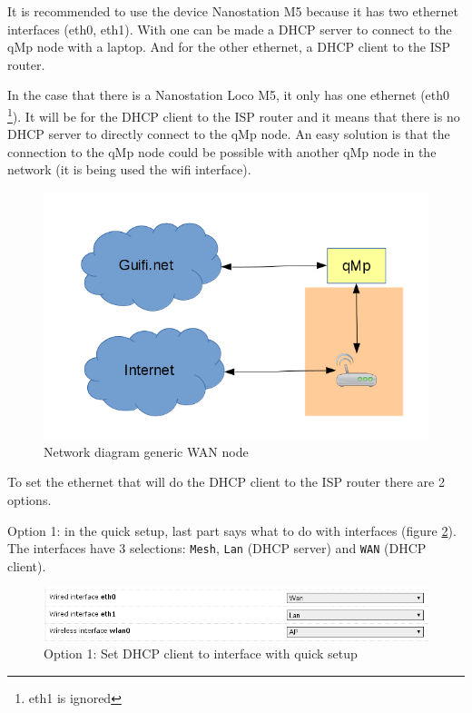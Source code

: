 \documentclass[11pt]{article}
\begin{document}
It is recommended to use the device Nanostation M5 because it has two
ethernet interfaces (eth0, eth1). With one can be made a DHCP server
to connect to the qMp node with a laptop. And for the other ethernet,
a DHCP client to the ISP router.

In the case that there is a Nanostation Loco M5, it only has one
ethernet (eth0 \footnote{eth1 is ignored}). It will be for the DHCP client to the ISP
router and it means that there is no DHCP server to directly connect
to the qMp node. An easy solution is that the connection to the qMp
node could be possible with another qMp node in the network (it is
being used the wifi interface).

\begin{figure}[htb]
\centering
\includegraphics[width=.9\linewidth]{./img/mesh-designs/wan_node_generic.png}
\caption{\label{fig:wan-gen}Network diagram generic WAN node}
\end{figure}

To set the ethernet that will do the DHCP client to the ISP router
there are 2 options.

Option 1: in the quick setup, last part says what to do with
interfaces (figure \ref{fig:quickdhcp}). The interfaces have 3 selections:
\texttt{Mesh}, \texttt{Lan} (DHCP server) and \texttt{WAN} (DHCP client).

\begin{figure}[htb]
\centering
\includegraphics[width=.9\linewidth]{./img/qMp-basics-scrot/quick_setup_interfaces.png}
\caption{\label{fig:quickdhcp}Option 1: Set DHCP client to interface with quick setup}
\end{figure}
\end{document}
